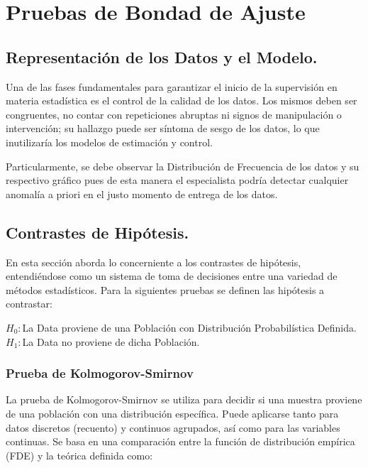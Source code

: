 \documentclass[]{article}
\begin{document}
\hypertarget{pruebas-de-bondad-de-ajuste}{%
\section{Pruebas de Bondad de
Ajuste}\label{pruebas-de-bondad-de-ajuste}}

\hypertarget{representacion-de-los-datos-y-el-modelo.}{%
\subsection{Representación de los Datos y el
Modelo.}\label{representacion-de-los-datos-y-el-modelo.}}

Una de las fases fundamentales para garantizar el inicio de la
supervisión en materia estadística es el control de la calidad de los
datos. Los mismos deben ser congruentes, no contar con repeticiones
abruptas ni signos de manipulación o intervención; su hallazgo puede ser
síntoma de sesgo de los datos, lo que inutilizaría los modelos de
estimación y control.

Particularmente, se debe observar la Distribución de Frecuencia de los
datos y su respectivo gráfico pues de esta manera el especialista podría
detectar cualquier anomalía a priori en el justo momento de entrega de
los datos.

\hypertarget{contrastes-de-hipotesis.}{%
\subsection{Contrastes de Hipótesis.}\label{contrastes-de-hipotesis.}}

En esta sección aborda lo concerniente a los contrastes de hipótesis,
entendiéndose como un sistema de toma de decisiones entre una variedad
de métodos estadísticos. Para la siguientes pruebas se definen las
hipótesis a contrastar:

\(H_0:\)La Data proviene de una Población con Distribución
Probabilística Definida.\\
\(H_1:\)La Data no proviene de dicha Población.

\hypertarget{prueba-de-kolmogorov-smirnov}{%
\subsubsection{Prueba de
Kolmogorov-Smirnov}\label{prueba-de-kolmogorov-smirnov}}

La prueba de Kolmogorov-Smirnov se utiliza para decidir si una muestra
proviene de una población con una distribución específica. Puede
aplicarse tanto para datos discretos (recuento) y continuos agrupados,
así como para las variables continuas. Se basa en una comparación entre
la función de distribución empírica (FDE) y la teórica definida como:
\end{document}

